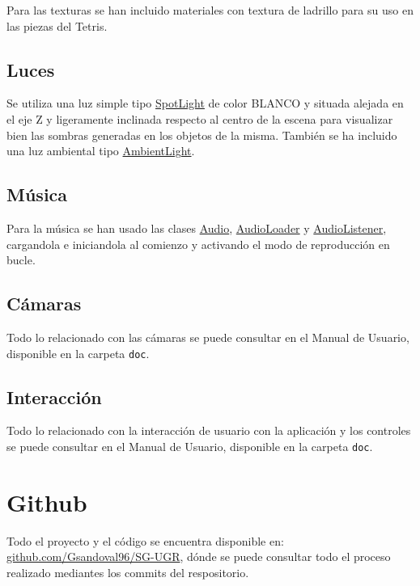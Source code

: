 \documentclass[11pt,a4paper]{article}
\begin{document}
    Para las texturas se han incluido materiales con textura de ladrillo para su uso en las piezas del Tetris.
    
    \subsection{Luces}
     
     Se utiliza una luz simple tipo \href{https://threejs.org/docs/#api/en/lights/SpotLight}{SpotLight} de color BLANCO y situada alejada en el eje Z y ligeramente inclinada respecto al centro de la escena para visualizar bien las sombras generadas en los objetos de la misma. También se ha incluido una luz ambiental tipo \href{https://threejs.org/docs/#api/en/lights/AmbientLight}{AmbientLight}.
        
    \subsection{Música}
    
    Para la música se han usado las clases \href{https://threejs.org/docs/#api/en/audio/Audio}{Audio}, \href{https://threejs.org/docs/#api/en/loaders/AudioLoader}{AudioLoader} y \href{https://threejs.org/docs/#api/en/audio/AudioListener}{AudioListener}, cargandola e iniciandola al comienzo y activando el modo de reproducción en bucle.
    
    \subsection{Cámaras}
    
    Todo lo relacionado con las cámaras se puede consultar en el Manual de Usuario, disponible en la carpeta \texttt{doc}.
    
    \subsection{Interacción}
    
    Todo lo relacionado con la interacción de usuario con la aplicación y los controles se puede consultar en el Manual de Usuario, disponible en la carpeta \texttt{doc}.

\section{Github}

Todo el proyecto y el código se encuentra disponible en: \href{https://github.com/Gsandoval96/SG-UGR/tree/master/P2}{github.com/Gsandoval96/SG-UGR}, dónde se puede consultar todo el proceso realizado mediantes los commits del respositorio.
\end{document}
